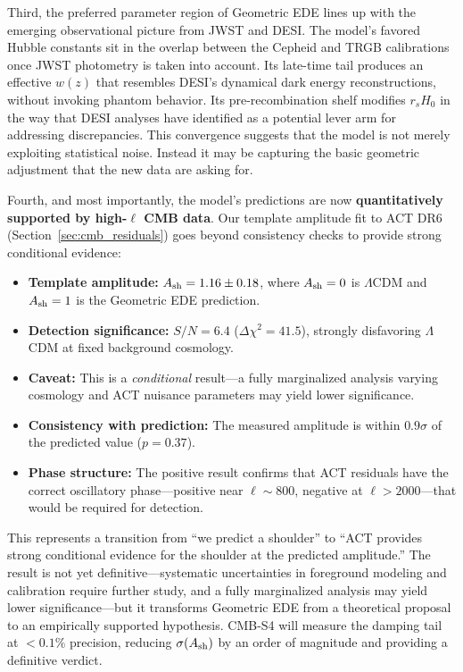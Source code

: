 \documentclass[a4paper,11pt]{article}
\begin{document}
Third, the preferred parameter region of Geometric EDE lines up with the emerging observational picture from JWST and DESI. The model's favored Hubble constants sit in the overlap between the Cepheid and TRGB calibrations once JWST photometry is taken into account. Its late-time tail produces an effective $w(z)$ that resembles DESI's dynamical dark energy reconstructions, without invoking phantom behavior. Its pre-recombination shelf modifies $r_s H_0$ in the way that DESI analyses have identified as a potential lever arm for addressing discrepancies. This convergence suggests that the model is not merely exploiting statistical noise. Instead it may be capturing the basic geometric adjustment that the new data are asking for.

Fourth, and most importantly, the model's predictions are now \textbf{quantitatively supported by high-$\ell$ CMB data}. Our template amplitude fit to ACT DR6 (Section~\ref{sec:cmb_residuals}) goes beyond consistency checks to provide strong conditional evidence:
\begin{itemize}
    \item \textbf{Template amplitude:} $A_{\rm sh} = 1.16 \pm 0.18$, where $A_{\rm sh} = 0$ is $\Lambda$CDM and $A_{\rm sh} = 1$ is the Geometric EDE prediction.
    \item \textbf{Detection significance:} $S/N = 6.4$ ($\Delta\chi^2 = 41.5$), strongly disfavoring $\Lambda$CDM at fixed background cosmology.
    \item \textbf{Caveat:} This is a \emph{conditional} result---a fully marginalized analysis varying cosmology and ACT nuisance parameters may yield lower significance.
    \item \textbf{Consistency with prediction:} The measured amplitude is within $0.9\sigma$ of the predicted value ($p = 0.37$).
    \item \textbf{Phase structure:} The positive result confirms that ACT residuals have the correct oscillatory phase---positive near $\ell \sim 800$, negative at $\ell > 2000$---that would be required for detection.
\end{itemize}
This represents a transition from ``we predict a shoulder'' to ``ACT provides strong conditional evidence for the shoulder at the predicted amplitude.'' The result is not yet definitive---systematic uncertainties in foreground modeling and calibration require further study, and a fully marginalized analysis may yield lower significance---but it transforms Geometric EDE from a theoretical proposal to an empirically supported hypothesis. CMB-S4 will measure the damping tail at $<0.1\%$ precision, reducing $\sigma(A_{\rm sh})$ by an order of magnitude and providing a definitive verdict.
\end{document}
